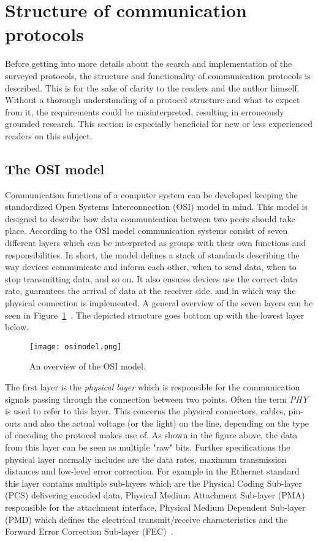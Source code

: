 \section{Structure of communication protocols}
\label{sec:structure_protocols}

Before getting into more details about the search and implementation of the surveyed protocols, the structure and functionality of communication protocols is described. This is for the sake of clarity to the readers and the author himself. Without a thorough understanding of a protocol structure and what to expect from it, the requirements could be misinterpreted, resulting in erroneously grounded research. This section is especially beneficial for new or less experienced readers on this subject.

\subsection{The OSI model}
Communication functions of a computer system can be developed keeping the standardized Open Systems Interconnection (OSI) \cite{OSImodel} model in mind. This model is designed to describe how data communication between two peers should take place. According to the OSI model communication systems consist of seven different layers which can be interpreted as groups with their own functions and responsibilities. In short, the model defines a stack of standards describing the way devices communicate and inform each other, when to send data, when to stop transmitting data, and so on. It also ensures devices use the correct data rate, guarantees the arrival of data at the receiver side, and in which way the physical connection is implemented.
A general overview of the seven layers can be seen in Figure~\ref{Fig:Osimodel}~\cite{OSImodel}. The depicted structure goes bottom up with the lowest layer below.

\begin{figure}[H]
	\centering
	\texttt{[image: osimodel.png]}	
	\caption{An overview of the OSI model.}
	\label{Fig:Osimodel}
\end{figure}

The first layer is the \textit{physical layer} which is responsible for the communication signals passing through the connection between two points. Often the term \textit{PHY} is used to refer to this layer. This concerns the physical connectors, cables, pin-outs and also the actual voltage (or the light) on the line, depending on the type of encoding the protocol makes use of. As shown in the figure above, the data from this layer can be seen as multiple "raw" bits. Further specifications the physical layer normally includes are the data rates, maximum transmission distances and low-level error correction.
For example in the Ethernet standard this layer contains multiple sub-layers which are the Physical Coding Sub-layer (PCS) delivering encoded data, Physical Medium Attachment Sub-layer (PMA) responsible for the attachment interface, Physical Medium Dependent Sub-layer (PMD) which defines the electrical transmit/receive characteristics and the Forward Error Correction Sub-layer (FEC)~\cite{EthernetPHY}.\\


